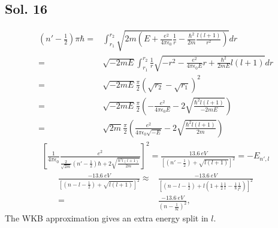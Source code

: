 \subsection*{Sol. 16}
\begin{align*}
    (n'-\frac{1}{2})\pi\hbar=&\int_{r_1}^{r_2}
    \sqrt{2m(E+\frac{e^2}{4\pi\epsilon_0}\frac{1}{r}-\frac{\hbar^2}{2m}\frac{l(l+1)}{r^2})}dr\\
    =&
    \sqrt{-2mE}\int_{r_1}^{r_2}
    \frac{1}{r}
    \sqrt{-r^2-\frac{e^2}{4\pi\epsilon_0 E}r+
    \frac{\hbar^2}{2mE}l(l+1)}dr\\
    =&\sqrt{-2mE}
    \frac{\pi}{2}(\sqrt{r_2}-\sqrt{r_1})^2\\
    =&\sqrt{-2mE}
    \frac{\pi}{2}(-\frac{e^2}{4\pi\epsilon_0 E}-2\sqrt{\frac{\hbar^2l(l+1)}{-2mE}})\\
    =&
    \sqrt{2m}
    \frac{\pi}{2}(\frac{e^2}{4\pi\epsilon_0 \sqrt{-E}}-2\sqrt{\frac{\hbar^2l(l+1)}{2m}})
\end{align*}
\begin{align*}
    \left[\frac{1}{4\pi\epsilon_0}\frac{e^2}{\frac{2}{\sqrt{2m}}(n'-\frac{1}{2})\hbar+
    2\sqrt{\frac{\hbar^2l(l+1)}{2m}}}\right]^2
    =
    \frac{\qty{13.6}{eV}}
    {[(n'-\frac{1}{2})+
    \sqrt{l(l+1)}]^2}
    =-E_{n',l}
\end{align*}
\begin{align*}
    \frac{-\qty{13.6}{eV}}
    {[(n-l-\frac{1}{2})+
    \sqrt{l(l+1)}]^2}\approx&
    \frac{-\qty{13.6}{eV}}
    {[(n-l-\frac{1}{2})+
    l(1+\frac{1}{2}\frac{1}{l} -\frac{1}{8}\frac{1}{l^2})]^2}\\
    =&\frac{-\qty{13.6}{eV}}{(n-\frac{1}{8l})^2},
\end{align*}
The WKB approximation gives an extra energy split in $l.$

